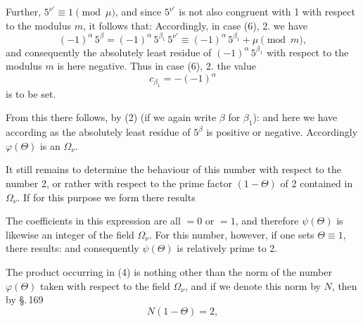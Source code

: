 
Further, $5^{\nu'} \equiv 1 \pmod{\mu}$, and since $5^{\nu'}$ is not also congruent
with 1 with respect to the modulus $m$, it follows that:
Accordingly, in case (6), 2. we have
\[
(-1)^\alpha\,5^\beta = (-1)^\alpha\,5^{\beta_1}\,5^{\nu'} \equiv (-1)^\alpha\,5^{\beta_1} + \mu \pmod{m},
\]
and consequently the absolutely least residue of $(-1)^\alpha\,5^{\beta_1}$
with respect to the modulus $m$ is here negative. Thus in case (6), 2. the value
\[
c_{\beta_1} = -(-1)^\alpha
\]
is to be set.

From this there follows, by (2) (if we again write $\beta$ for $\beta_1$):
and here we have
according as the absolutely least residue of $5^\beta$ is positive or
negative. Accordingly $\varphi(\Theta)$ is an  $\Omega_\nu$.

It still remains to determine the behaviour of this number with
respect to the number 2, or rather with respect to the prime factor
$(1 - \Theta)$ of 2 contained in $\Omega_\nu$. If for this purpose we form
there results

The coefficients in this expression are all $= 0$ or
$= 1$, and therefore $\psi(\Theta)$ is likewise an integer of the field $\Omega_\nu$.
For this number, however, if one sets $\Theta \equiv 1$, there results:
and consequently $\psi(\Theta)$ is relatively prime to 2.

The product occurring in (4) is nothing other than the norm of the
number $\varphi(\Theta)$ taken with respect to the field $\Omega_\nu$,
and if we denote this norm by $N$, then by \S.\,169
\[
N(1-\Theta) = 2,
\]
